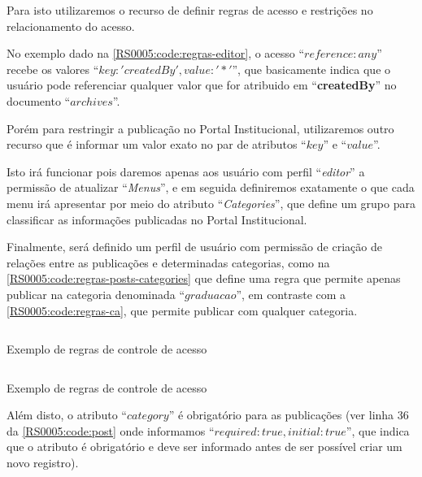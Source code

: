 Para isto utilizaremos o recurso de definir regras de acesso e restrições no relacionamento do acesso.

No exemplo dado na \cref{RS0005:code:regras-editor}, o acesso ``\textbf{$reference:any$}'' recebe os valores ``\textbf{${ key: 'createdBy', value: '*' }$}'', que basicamente indica que o usuário pode referenciar qualquer valor que for atribuido em ``\textbf{createdBy}'' no documento ``$archives$''.

Porém para restringir a publicação no Portal Institucional, utilizaremos outro recurso que é informar um valor exato no par de atributos ``\textbf{$key$}'' e ``\textbf{$value$}''.

Isto irá funcionar pois daremos apenas aos usuário com perfil ``\textit{editor}'' a permissão de atualizar ``\textit{Menus}'', e em seguida definiremos exatamente o que cada menu irá apresentar por meio do atributo ``\textit{Categories}'', que define um grupo para classificar as informações publicadas no Portal Institucional.

Finalmente, será definido um perfil de usuário com permissão de criação de relações entre as publicações e determinadas categorias, como na \cref{RS0005:code:regras-posts-categories} que define uma regra que permite apenas publicar na categoria denominada ``$graduacao$'', em contraste com a \cref{RS0005:code:regras-ca}, que permite publicar com qualquer categoria.

\begin{code}
    \inputminted[xleftmargin=20pt,fontsize=\footnotesize,breaklines,breakanywhere,linenos=true,label=rules.json,firstline=155,lastline=157]{JavaScript}{../RS0005/anexos/rules.js}
    \caption{Exemplo de regras de controle de acesso}\label{RS0005:code:regras-posts-categories}
\end{code}

\begin{code}
    \inputminted[xleftmargin=20pt,fontsize=\footnotesize,breaklines,breakanywhere,linenos=true,label=rules.json,firstline=123,lastline=125]{JavaScript}{../RS0005/anexos/rules.js}
    \caption{Exemplo de regras de controle de acesso}\label{RS0005:code:regras-ca}
\end{code}

Além disto, o atributo ``$category$'' é obrigatório para as publicações (ver linha $36$ da \cref{RS0005:code:post} onde informamos ``$required: true, initial: true$'', que indica que o atributo é obrigatório e deve ser informado antes de ser possível criar um novo registro).

